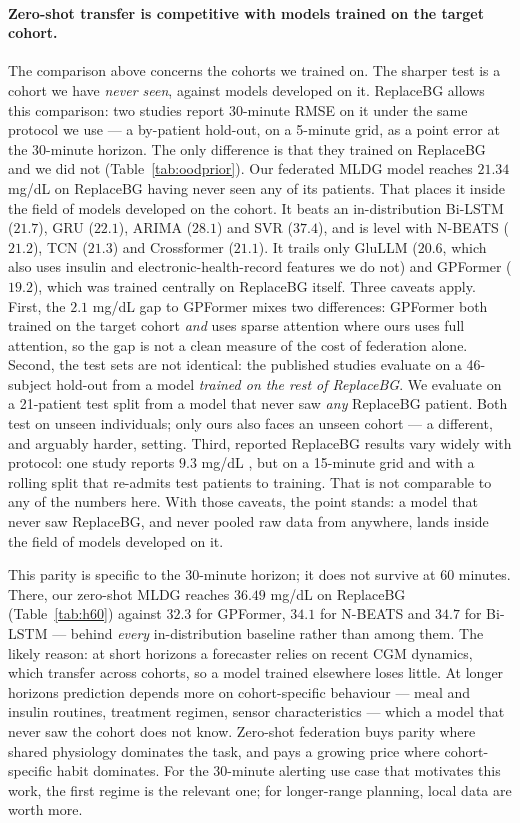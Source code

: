 \documentclass[10pt,letterpaper]{article}
\begin{document}
\paragraph{Zero-shot transfer is competitive with models trained on the target
cohort.} The comparison above concerns the cohorts we trained on. The sharper
test is a cohort we have \emph{never seen}, against models developed on it.
ReplaceBG allows this comparison: two studies report 30-minute RMSE on it
under the same protocol we use --- a by-patient hold-out, on a 5-minute grid,
as a point error at the 30-minute horizon. The only difference is that they
trained on ReplaceBG and we did not (Table~\ref{tab:oodprior}). Our federated
MLDG model reaches $21.34$ mg/dL on ReplaceBG having never seen any of its
patients. That places it inside the field of models developed on the cohort.
It beats an in-distribution Bi-LSTM ($21.7$), GRU ($22.1$), ARIMA ($28.1$)
and SVR ($37.4$), and is level with N-BEATS ($21.2$), TCN ($21.3$) and
Crossformer ($21.1$). It trails only GluLLM ($20.6$, which also uses insulin
and electronic-health-record features we do not) and GPFormer ($19.2$), which
was trained centrally on ReplaceBG itself. Three caveats apply. First, the
$2.1$ mg/dL gap to GPFormer mixes two differences: GPFormer both trained on
the target cohort \emph{and} uses sparse attention where ours uses full
attention, so the gap is not a clean measure of the cost of federation alone.
Second, the test sets are not identical: the published studies evaluate on a
46-subject hold-out from a model \emph{trained on the rest of ReplaceBG}. We
evaluate on a 21-patient test split from a model that never saw \emph{any}
ReplaceBG patient. Both test on unseen individuals; only ours also faces an
unseen cohort --- a different, and arguably harder, setting. Third, reported
ReplaceBG results vary widely with protocol: one study reports $9.3$ mg/dL
\cite{jaloli2023cnnlstm}, but on a 15-minute grid and with a rolling split
that re-admits test patients to training. That is not comparable to any of
the numbers here. With those caveats, the point stands: a model that never
saw ReplaceBG, and never pooled raw data from anywhere, lands inside the
field of models developed on it.

This parity is specific to the 30-minute horizon; it does not survive at 60
minutes. There, our zero-shot MLDG reaches $36.49$ mg/dL on ReplaceBG
(Table~\ref{tab:h60}) against $32.3$ for GPFormer, $34.1$ for N-BEATS and
$34.7$ for Bi-LSTM \cite{zhu2024gpformer} --- behind \emph{every}
in-distribution baseline rather than among them. The likely reason: at short
horizons a forecaster relies on recent CGM dynamics, which transfer across
cohorts, so a model trained elsewhere loses little. At longer horizons
prediction depends more on cohort-specific behaviour --- meal and insulin
routines, treatment regimen, sensor characteristics --- which a model that
never saw the cohort does not know. Zero-shot federation buys parity where
shared physiology dominates the task, and pays a growing price where
cohort-specific habit dominates. For the 30-minute alerting use case that
motivates this work, the first regime is the relevant one; for longer-range
planning, local data are worth more.
\end{document}
